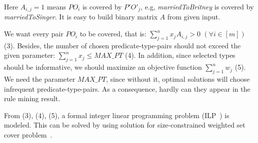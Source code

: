 \documentclass{acm_proc_article-sp}
\begin{document}
Here $A_{i,j} = 1$ means $PO_{i}$ is covered by $P'O'_{j}$, e.g, \textit{marriedToBritney} is covered by \textit{marriedToSinger}. It is easy to build binary matrix $A$ from given input.

We want every pair $PO_{i}$ to be covered, that is: $\sum_{j=1}^{n}{x_{j} A_{i,j}} > 0$ $(\forall i \in [m])$ (3). Besides, the number of chosen predicate-type-pairs should not exceed the given parameter: $\sum_{j=1}^{n}{x_{j}} \leq MAX\_PT$ (4). In addition, since selected types should be informative, we should maximize an objective function $\sum_{j=1}^{n}{w_{j}}$ (5). We need the parameter $MAX\_PT$, since without it, optimal solutions will choose infrequent predicate-type-pairs. As a consequence, hardly can they appear in the rule mining result.

From (3), (4), (5), a formal integer linear programming problem (ILP~\cite{ref1}) is modeled. This can be solved by using solution for size-constrained weighted set cover problem~\cite{ref3}.



\end{document}
